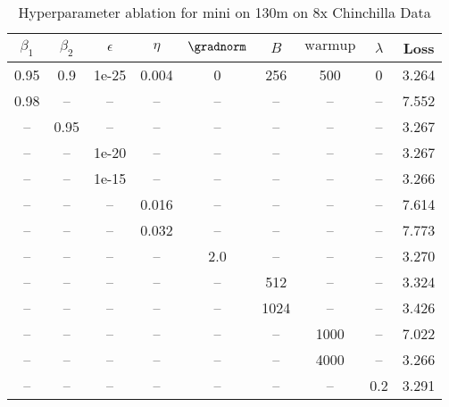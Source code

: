 \begin{table}[h!]
\centering
\caption{Hyperparameter ablation for mini on 130m on 8x Chinchilla Data}
\label{tab:ablation_mini_130m_on_8x_chinchilla_data}
\begin{tabular}{ccccccccc}
\toprule
$\beta_1$ & $\beta_2$ & $\epsilon$ & $\eta$ & $\gradnorm$ & $B$ & $\mathrm{warmup}$ & $\lambda$ & Loss \\
\midrule
0.95 & 0.9 & 1e-25 & 0.004 & 0 & 256 & 500 & 0 & 3.264 \\
\midrule
0.98 & -- & -- & -- & -- & -- & -- & -- & 7.552 \\
-- & 0.95 & -- & -- & -- & -- & -- & -- & 3.267 \\
-- & -- & 1e-20 & -- & -- & -- & -- & -- & 3.267 \\
-- & -- & 1e-15 & -- & -- & -- & -- & -- & 3.266 \\
-- & -- & -- & 0.016 & -- & -- & -- & -- & 7.614 \\
-- & -- & -- & 0.032 & -- & -- & -- & -- & 7.773 \\
-- & -- & -- & -- & 2.0 & -- & -- & -- & 3.270 \\
-- & -- & -- & -- & -- & 512 & -- & -- & 3.324 \\
-- & -- & -- & -- & -- & 1024 & -- & -- & 3.426 \\
-- & -- & -- & -- & -- & -- & 1000 & -- & 7.022 \\
-- & -- & -- & -- & -- & -- & 4000 & -- & 3.266 \\
-- & -- & -- & -- & -- & -- & -- & 0.2 & 3.291 \\
\bottomrule
\end{tabular}
\end{table}

